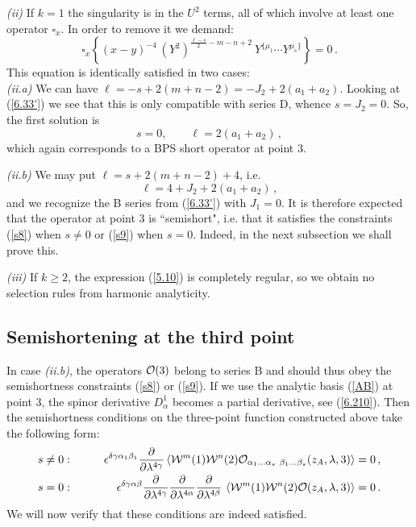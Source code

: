 \documentclass[a4paper,11pt]{article}
\begin{document}
{\it (ii)} If $k=1$ the singularity is in the $U^2$ terms, all of which involve
at least one operator $\square_x$. In order to remove it we demand:
\begin{equation}\label{5.11}
  \square_x \left\{(x-y)^{-4}
  \ (Y^2)^{\frac{\ell-s}{2}-m-n+2}\ Y^{\{\mu_1}\cdots
  Y^{\mu_s\}} \right\} = 0\,.
\end{equation}
This equation is identically satisfied in two cases: \\
{\it (ii.a)} We can have $\ell = -s + 2(m+n-2) = -J_2 + 2(a_1+
a_2)$. Looking at (\ref{6.33'}) we see that this is only
compatible with series D, whence $s=J_2=0$. So, the first solution
is
\begin{equation} \label{firstk1}
s=0, \qquad \ell = 2(a_1+a_2) \, ,
\end{equation}
which again corresponds to a BPS short operator at point 3.

{\it (ii.b)}  We may put $\ell=s + 2(m+n-2) + 4$, i.e.
\begin{equation} \label{secondk1}
\ell = 4 +  J_2 + 2(a_1+a_2) \, ,
\end{equation}
and we recognize the B series from (\ref{6.33'}) with $J_1=0$. It is
therefore expected that the operator at point 3 is ``semishort",
i.e. that it satisfies the constraints (\ref{s8}) when $s\neq0$
or (\ref{s9}) when $s=0$. Indeed, in the next subsection we shall
prove this.

{\it (iii)} If $k\geq 2$, the expression (\ref{5.10}) is
completely regular, so we obtain no selection rules from harmonic
analyticity.


\subsection{Semishortening at the third point}

In case {\it (ii.b)}, the operators ${\cal O}(3)$ belong to series B and should
thus obey the semishortness constraints (\ref{s8}) or (\ref{s9}). If we use
the analytic basis (\ref{AB}) at point 3, the spinor derivative $D^1_\alpha$
becomes a partial derivative, see (\ref{6.210}). Then the semishortness
conditions on the three-point function constructed above take the following
form:
\begin{eqnarray}
 & s \neq 0: \qquad
& \epsilon^{\delta \gamma \alpha_1 \beta_1} \frac{\partial}{\partial\lambda^{4
\gamma}} \,\langle {\cal W}^m(1) {\cal W}^n(2) {\cal O}_{\alpha_1 \ldots
\alpha_s \ \beta_1 \ldots \beta_s}
(z_A,\lambda,3)\rangle = 0 \, ,  \label{const1}  \\
& s=0: \qquad & \epsilon^{\delta \gamma \alpha \beta}
\frac{\partial}{\partial\lambda^{4 \gamma}}\frac{\partial}{\partial\lambda^{4
\alpha}}\frac{\partial}{\partial\lambda^{4 \beta}}  \ \langle {\cal W}^m(1) {\cal
W}^n(2) {\cal O} (z_A,\lambda,3)\rangle = 0 \, . \label{const2}
\end{eqnarray}
We will now verify that these conditions are indeed satisfied.
\end{document}
